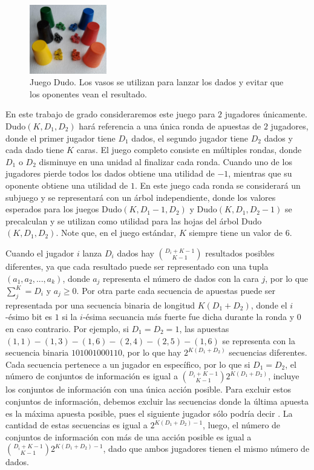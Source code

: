 \begin{figure}[h]
    \centering
    \includegraphics[width=0.3\textwidth]{figuras/dudo.jpg}
    \caption[Juego Dudo]{Juego Dudo. Los vasos se utilizan para lanzar los dados y evitar que los oponentes vean el resultado.}
    \label{fig:dudo}
\end{figure}

En este trabajo de grado consideraremos este juego para $2$ jugadores únicamente. Dudo$(K, D_1, D_2)$ hará referencia a una única ronda de apuestas de $2$ jugadores, donde el primer jugador tiene $D_1$ dados, el segundo jugador tiene $D_2$ dados y cada dado tiene $K$ caras. El juego completo consiste en múltiples rondas, donde $D_1$ o $D_2$ disminuye en una unidad al finalizar cada ronda. Cuando uno de los jugadores pierde todos los dados obtiene una utilidad de $-1$, mientras que su oponente obtiene una utilidad de $1$. En este juego cada ronda se considerará un subjuego y se representará con un árbol independiente, donde los valores esperados para los juegos Dudo$(K, D_1 - 1, D_2)$ y Dudo$(K, D_1, D_2 - 1)$ se precalculan y se utilizan como utilidad para las hojas del árbol Dudo$(K, D_1, D_2)$. Note que, en el juego estándar, $K$ siempre tiene un valor de $6$.

Cuando el jugador $i$ lanza $D_i$ dados hay $\binom{D_i+K-1}{K-1}$ resultados posibles diferentes, ya que cada resultado puede ser representado con una tupla $(a_1, a_2, ..., a_k)$, donde $a_j$ representa el número de dados con la cara $j$, por lo que $\sum_j^K = D_i$ y $a_j \geq 0$. Por otra parte cada secuencia de apuestas puede ser representada por una secuencia binaria de longitud $K(D_1 + D_2)$, donde el $i$-ésimo bit es $1$ si la $i$-ésima secuancia más fuerte fue dicha durante la ronda y $0$ en caso contrario. Por ejemplo, si $D_1 = D_2 = 1$, las apuestas $(1, 1)-(1, 3)-(1, 6)-(2, 4)-(2, 5)-(1, 6)$ se representa con la secuencia binaria $101001000110$, por lo que hay $2^{K(D_1 + D_2)}$ secuencias diferentes. Cada secuencia pertenece a un jugador en específico, por lo que si $D_1 = D_2$, el número de conjuntos de información  es igual a  $\binom{D_i+K-1}{K-1}2^{K(D_1 + D_2)}$, incluye los conjuntos de información con una única acción posible. Para excluir estos conjuntos de información, debemos excluir las secuencias donde la última apuesta es la máxima apuesta posible, pues el siguiente jugador sólo podría decir . La cantidad de estas secuencias es igual a $2^{K(D_1 + D_2)-1}$, luego, el número de conjuntos de información con más de una acción posible es igual a $\binom{D_i+K-1}{K-1}2^{K(D_1 + D_2)-1}$, dado que ambos jugadores tienen el mismo número de dados.

